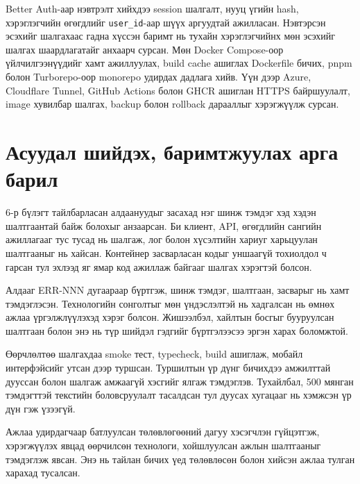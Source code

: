 \documentclass[../main.tex]{subfiles}
\begin{document}
Better Auth-аар нэвтрэлт хийхдээ session шалгалт, нууц үгийн hash,
хэрэглэгчийн өгөгдлийг \texttt{user\_id}-аар шүүх аргуудтай ажилласан.
Нэвтэрсэн эсэхийг шалгахаас гадна хүссэн баримт нь тухайн хэрэглэгчийнх
мөн эсэхийг шалгах шаардлагатайг анхаарч сурсан. Мөн Docker Compose-оор
үйлчилгээнүүдийг хамт ажиллуулах, build cache ашиглах Dockerfile бичих,
pnpm болон Turborepo-оор monorepo удирдах дадлага хийв. Үүн дээр Azure,
Cloudflare Tunnel, GitHub Actions болон GHCR ашиглан HTTPS байршуулалт,
image хувилбар шалгах, backup болон rollback дарааллыг хэрэгжүүлж сурсан.

\section{Асуудал шийдэх, баримтжуулах арга барил}

6-р бүлэгт тайлбарласан алдаануудыг засахад нэг шинж тэмдэг хэд хэдэн
шалтгаантай байж болохыг анзаарсан. Би клиент, API, өгөгдлийн сангийн
ажиллагааг тус тусад нь шалгаж, лог болон хүсэлтийн хариуг харьцуулан
шалтгааныг нь хайсан. Контейнер засварласан кодыг уншаагүй тохиолдол ч
гарсан тул эхлээд яг ямар код ажиллаж байгааг шалгах хэрэгтэй болсон.

Алдааг ERR-NNN дугаараар бүртгэж, шинж тэмдэг, шалтгаан, засварыг нь хамт
тэмдэглэсэн. Технологийн сонголтыг мөн үндэслэлтэй нь хадгалсан нь өмнөх
ажлаа үргэлжлүүлэхэд хэрэг болсон. Жишээлбэл, хайлтын босгыг бууруулсан
шалтгаан болон энэ нь түр шийдэл гэдгийг бүртгэлээсээ эргэн харах боломжтой.

Өөрчлөлтөө шалгахдаа smoke тест, typecheck, build ашиглаж, мобайл
интерфэйсийг утсан дээр туршсан. Туршилтын үр дүнг бичихдээ амжилттай
дууссан болон шалгаж амжаагүй хэсгийг ялгаж тэмдэглэв. Тухайлбал, 500
мянган тэмдэгттэй текстийн боловсруулалт тасалдсан тул дуусах хугацааг нь
хэмжсэн үр дүн гэж үзээгүй.

Ажлаа удирдагчаар батлуулсан төлөвлөгөөний дагуу хэсэгчлэн гүйцэтгэж,
хэрэгжүүлэх явцад өөрчилсөн технологи, хойшлуулсан ажлын шалтгааныг
тэмдэглэж явсан. Энэ нь тайлан бичих үед төлөвлөсөн болон хийсэн ажлаа
тулган харахад тусалсан.
\end{document}
